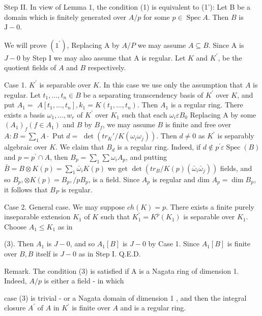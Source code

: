 Step II. In view of Lemma 1, the condition (1) is equivalent to (1'): Let B be a domain which is finitely generated over $A / p$ for some $p \in \operatorname{Spec} A$. Then $B$ is $\mathrm{J}-0$.

We will prove $\left(1^{\prime}\right)$, Replacing A by $A / P$ we may assume $A \subseteq B$. Since A is $J-0$ by Step I we may also assume that A is regular. Let $K$ and $K^{\prime}$, be the quotient fields of $A$ and $B$ respectively.

Case 1. $K^{\prime}$ is separable over $K$. In this case we use only the assumption that $A$ is regular. Let $t_{1}, \ldots, t_{n} \in B$ be a separating transcendency basis of $K^{\prime}$ over $K$, and put $A_{1}=$ $A\left[t_{1}, \ldots, t_{n}\right], k_{1}=K\left(t_{1}, \ldots, t_{n}\right)$. Then $A_{1}$ is a regular ring. There exists a basis $\omega_{1}, \ldots, w_{r}$ of $K^{\prime}$ over $K_{1}$ such that each $\omega_{i} \varepsilon B_{0}$ Replacing A by some $\left(A_{1}\right)_{f}\left(f \in A_{1}\right)$ and $B$ by $B_{f}$, we may assume $B$ is finite and free over $A: B=\sum_{1} A \cdot$ Put $d=$ $\operatorname{det}\left(t r_{K} \prime / K\left(\omega_{i} \omega_{j}\right)\right)$. Then $d \neq 0$ as $K^{\prime}$ is separably algebraic over $K$. We claim that $B_{d}$ is a regular ring. Indeed, if $d \notin p^{\prime} \varepsilon \operatorname{Spec}(B)$ and $p=p^{\prime} \cap A$, then $B_{p}=\sum_{1} \sum \omega_{i} A_{p}$, and putting $\bar{B}=B \otimes K(p)=\sum_{1} \bar{\omega}_{i} K(p)$ we get $\operatorname{det}\left(t r_{B} / K(p)\left(\bar{\omega}_{i} \bar{\omega}_{j}\right)\right)$ fields, and so $B_{p}, \otimes K(p)=B_{p}, / p B_{p}$, is a field. Since $A_{p}$ is regular and dim $A_{p}=\operatorname{dim} B_{p}$, it follows that $B_{P}$ is regular.

Case 2. General case. We may suppose $c h(K)=p$. There exists a finite purely inseparable extension $K_{1}$ of $K$ such that $K_{1}^{\prime}=K^{p}\left(K_{1}\right)$ is separable over $K_{1}$. Choose $A_{1} \leqslant K_{1}$ as in

(3). Then $A_{1}$ is $J-0$, and so $A_{1}[B]$ is $J-0$ by Case 1. Since $A_{1}[B]$ is finite over $B, B$ itself is $J-0$ as in Step I. Q.E.D.

Remark. The condition (3) is satisfied if A is a Nagata ring of dimension 1. Indeed, $A / p$ is either a field - in which

case (3) is trivial - or a Nagata domain of dimension 1 , and then the integral closure $A^{\prime}$ of $A$ in $K^{\prime}$ is finite over $A$ and is a regular ring.

